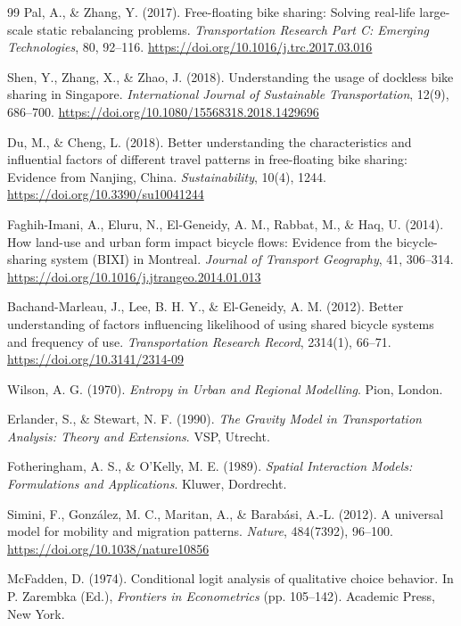 \begin{thebibliography}{99}
Pal, A., \& Zhang, Y. (2017). Free-floating bike sharing: Solving real-life
large-scale static rebalancing problems. \emph{Transportation Research Part C:
Emerging Technologies}, 80, 92--116.
\url{https://doi.org/10.1016/j.trc.2017.03.016}

Shen, Y., Zhang, X., \& Zhao, J. (2018). Understanding the usage of dockless bike
sharing in Singapore. \emph{International Journal of Sustainable Transportation},
12(9), 686--700. \url{https://doi.org/10.1080/15568318.2018.1429696}

Du, M., \& Cheng, L. (2018). Better understanding the characteristics and
influential factors of different travel patterns in free-floating bike sharing:
Evidence from Nanjing, China. \emph{Sustainability}, 10(4), 1244.
\url{https://doi.org/10.3390/su10041244}

Faghih-Imani, A., Eluru, N., El-Geneidy, A. M., Rabbat, M., \& Haq, U. (2014).
How land-use and urban form impact bicycle flows: Evidence from the
bicycle-sharing system (BIXI) in Montreal. \emph{Journal of Transport Geography},
41, 306--314. \url{https://doi.org/10.1016/j.jtrangeo.2014.01.013}

Bachand-Marleau, J., Lee, B. H. Y., \& El-Geneidy, A. M. (2012). Better
understanding of factors influencing likelihood of using shared bicycle systems
and frequency of use. \emph{Transportation Research Record}, 2314(1), 66--71.
\url{https://doi.org/10.3141/2314-09}

Wilson, A. G. (1970). \emph{Entropy in Urban and Regional Modelling}. Pion, London.

Erlander, S., \& Stewart, N. F. (1990). \emph{The Gravity Model in Transportation
Analysis: Theory and Extensions}. VSP, Utrecht.

Fotheringham, A. S., \& O'Kelly, M. E. (1989). \emph{Spatial Interaction Models:
Formulations and Applications}. Kluwer, Dordrecht.

Simini, F., Gonz\'alez, M. C., Maritan, A., \& Barab\'asi, A.-L. (2012). A
universal model for mobility and migration patterns. \emph{Nature}, 484(7392),
96--100. \url{https://doi.org/10.1038/nature10856}

McFadden, D. (1974). Conditional logit analysis of qualitative choice behavior. In
P. Zarembka (Ed.), \emph{Frontiers in Econometrics} (pp. 105--142). Academic Press,
New York.


\end{thebibliography}
